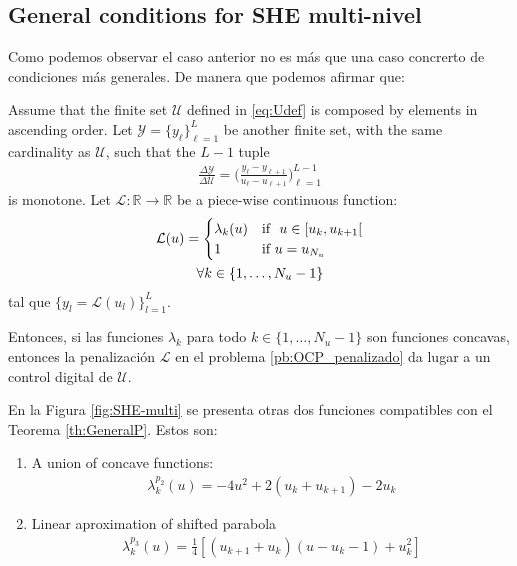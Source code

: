 \subsection{General conditions for  SHE multi-nivel}   

Como podemos observar el caso anterior no es más que una caso concrerto de condiciones más generales. De manera que podemos afirmar que: 
\vspace{1em}
\begin{theorem}\label{th:GeneralP}
    Assume that the finite set $\mathcal{U}$ defined in \eqref{eq:Udef} is composed by elements in ascending order. Let $\mathcal{Y} = \{y_\ell\}_{\ell=1}^L$ be another finite set, with the same cardinality as $\mathcal U$, such that the $L-1$ tuple
    \begin{gather}
        \frac{\Delta \mathcal{Y}}{\Delta \mathcal{U}} = \Bigg( \frac{y_\ell - y_{\ell+1}}{u_\ell - u_{\ell+1}} \Bigg)_{\ell=1}^{L-1}
    \end{gather}  is monotone. Let $\mathcal{L}:\mathbb{R} \rightarrow \mathbb{R}$ be a piece-wise continuous function:
    \begin{gather}
        \mathcal{L}(u) = \begin{cases}
            \lambda_k(u) & \text{if }  u \in [u_k,u_{k+1}[ \\
            1 & \text{if } u = u_{N_u} 
        \end{cases} \\
        \notag \forall k \in \{1,\dots,N_u-1\}
    \end{gather}    
    tal que $\{y_l = \mathcal{L}(u_l)\}_{l=1}^L$. 
    
    Entonces, si las funciones $\lambda_k$ para todo $k \in  \{1,\dots,N_u-1\}$  son funciones concavas, entonces la penalización $\mathcal{L}$ en el problema \ref{pb:OCP_penalizado} da lugar a un control digital de $\mathcal{U}$.
\end{theorem}

En la Figura \ref{fig:SHE-multi} se presenta otras dos funciones  compatibles con el Teorema \ref{th:GeneralP}. Estos son:

\begin{enumerate}
    \item A union of concave functions:
    \begin{gather}
        \lambda_k^{p_2}(u) = -4u^2 + 2(u_k + u_{k+1}) - 2u_{k}
    \end{gather}
    \item Linear aproximation of shifted parabola
    \begin{gather}
        \lambda_k^{p_3}(u) = \frac 1 4[(u_{k+1}+u_{k}) (u-u_k-1) + u_k^2]
    \end{gather}
\end{enumerate}

